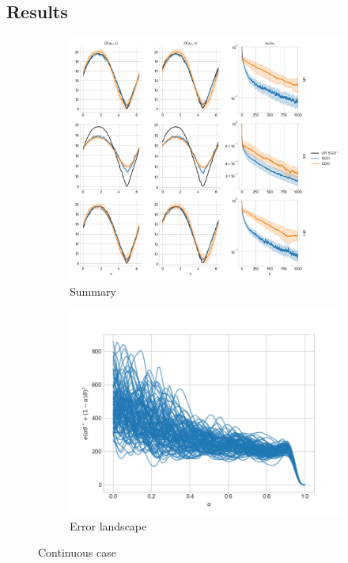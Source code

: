 \documentclass[10.5pt]{article}
\begin{document}
\subsection{Results}

\begin{figure}[H]
    \centering
    \begin{subfigure}{.9\textwidth}
      \centering
      \includegraphics[width=\linewidth]{../figs/Q_ctrl_SGD_vs_CBO_summary_continuous_resnet.png}
      \caption{Summary}
      \label{fig:summary_cont}
    \end{subfigure}
    \begin{subfigure}{.5\textwidth}
      \centering
      \includegraphics[width=\linewidth]{../figs/Q_ctrl_landscape_plot_continuous_resnet.png}
      \caption{Error landscape}
      \label{fig:error_landscape_cont}
    \end{subfigure}
    \caption{Continuous case}
    \label{fig:cont}
\end{figure}
\end{document}
